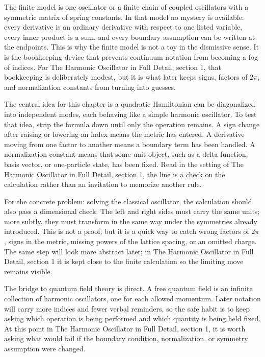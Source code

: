 The finite model is one oscillator or a finite chain of coupled oscillators with a symmetric matrix of spring constants.  In that model no mystery is available: every derivative is an ordinary derivative with respect to one listed variable, every inner product is a sum, and every boundary assumption can be written at the endpoints.  This is why the finite model is not a toy in the dismissive sense.  It is the bookkeeping device that prevents continuum notation from becoming a fog of indices.  For The Harmonic Oscillator in Full Detail, section 1, that bookkeeping is deliberately modest, but it is what later keeps signs, factors of \(2\pi\), and normalization constants from turning into guesses.

The central idea for this chapter is a quadratic Hamiltonian can be diagonalized into independent modes, each behaving like a simple harmonic oscillator.  To test that idea, strip the formula down until only the operation remains.  A sign change after raising or lowering an index means the metric has entered.  A derivative moving from one factor to another means a boundary term has been handled.  A normalization constant means that some unit object, such as a delta function, basis vector, or one-particle state, has been fixed.  Read in the setting of The Harmonic Oscillator in Full Detail, section 1, the line is a check on the calculation rather than an invitation to memorize another rule.

For the concrete problem: solving the classical oscillator, the calculation should also pass a dimensional check.  The left and right sides must carry the same units; more subtly, they must transform in the same way under the symmetries already introduced.  This is not a proof, but it is a quick way to catch wrong factors of \(2\pi\), signs in the metric, missing powers of the lattice spacing, or an omitted charge.  The same step will look more abstract later; in The Harmonic Oscillator in Full Detail, section 1 it is kept close to the finite calculation so the limiting move remains visible.

The bridge to quantum field theory is direct.  A free quantum field is an infinite collection of harmonic oscillators, one for each allowed momentum.  Later notation will carry more indices and fewer verbal reminders, so the safe habit is to keep asking which operation is being performed and which quantity is being held fixed.  At this point in The Harmonic Oscillator in Full Detail, section 1, it is worth asking what would fail if the boundary condition, normalization, or symmetry assumption were changed.


